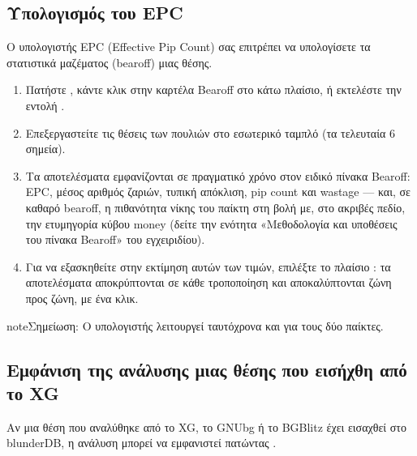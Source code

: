 \documentclass[letterpaper,10pt,greek]{sphinxmanual}
\begin{document}
\subsection{Υπολογισμός του EPC}
\label{\detokenize{guide_utilisateur:calculer-l-epc}}
\sphinxAtStartPar
Ο υπολογιστής EPC (Effective Pip Count) σας επιτρέπει να υπολογίσετε τα στατιστικά μαζέματος (bearoff) μιας θέσης.
\begin{enumerate}
%
\item {} 
\sphinxAtStartPar
Πατήστε , κάντε κλικ στην καρτέλα Bearoff στο κάτω πλαίσιο, ή εκτελέστε την εντολή .

\item {} 
\sphinxAtStartPar
Επεξεργαστείτε τις θέσεις των πουλιών στο εσωτερικό ταμπλό (τα τελευταία 6 σημεία).

\item {} 
\sphinxAtStartPar
Τα αποτελέσματα εμφανίζονται σε πραγματικό χρόνο στον ειδικό πίνακα Bearoff: EPC, μέσος αριθμός ζαριών, τυπική απόκλιση, pip count και wastage — και, σε καθαρό bearoff, η πιθανότητα νίκης του παίκτη στη βολή με, στο ακριβές πεδίο, την ετυμηγορία κύβου money (δείτε την ενότητα «Μεθοδολογία και υποθέσεις του πίνακα Bearoff» του εγχειριδίου).

\item {} 
\sphinxAtStartPar
Για να εξασκηθείτε στην εκτίμηση αυτών των τιμών, επιλέξτε το πλαίσιο : τα αποτελέσματα αποκρύπτονται σε κάθε τροποποίηση και αποκαλύπτονται ζώνη προς ζώνη, με ένα κλικ.

\end{enumerate}

\begin{sphinxadmonition}{note}{Σημείωση:}
\sphinxAtStartPar
Ο υπολογιστής λειτουργεί ταυτόχρονα και για τους δύο παίκτες.
\end{sphinxadmonition}


\subsection{Εμφάνιση της ανάλυσης μιας θέσης που εισήχθη από το XG}
\label{\detokenize{guide_utilisateur:afficher-l-analyse-d-une-position-importee-depuis-xg}}
\sphinxAtStartPar
Αν μια θέση που αναλύθηκε από το XG, το GNUbg ή το BGBlitz έχει εισαχθεί στο blunderDB, η ανάλυση μπορεί να εμφανιστεί πατώντας .
\end{document}
